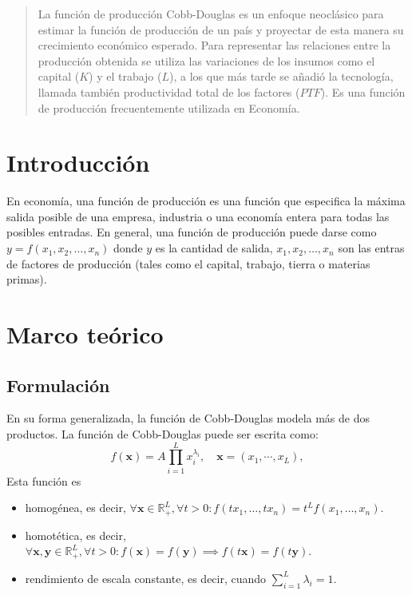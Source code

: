 \documentclass{sciposter}
\begin{document}
\begin{abstract}
La función de producción Cobb-Douglas es un enfoque neoclásico para estimar la función de producción de un país y proyectar de esta manera su crecimiento económico esperado. Para representar las relaciones entre la producción obtenida se utiliza las variaciones de los insumos como el capital ($K$) y el trabajo ($L$), a los que más tarde se añadió la tecnología, llamada también productividad total de los factores ($PTF$). Es una función de producción frecuentemente utilizada en Economía.
\end{abstract}

\begin{multicols*}{2}

\section{Introducción}
En economía, una función de producción es una función que especifica la máxima salida posible de una empresa, industria o una economía entera  para todas las posibles entradas. En general, una función de producción puede darse como $y=f\left(x_{1},x_{2},\ldots,x_{n}\right)$ donde $y$ es la cantidad de salida, $x_{1},x_{2},\ldots,x_{n}$ son las entras de factores de producción (tales como el capital, trabajo, tierra o materias primas).

\section{Marco teórico}

\subsection*{Formulación}
En su forma generalizada, la función de Cobb-Douglas modela más de dos productos. La función de Cobb-Douglas puede ser escrita como:
\begin{equation}
f\left(\bm{x}\right)=A\prod_{i=1}^{L}x_{i}^{\lambda_{i}},\quad \bm{x}=\left(x_{1},\cdots,x_{L} \right),
\end{equation}
Esta función es
\begin{itemize}
	\item homogénea, es decir, $\forall\bm{x}\in\mathbb{R}^{L}_{+},\forall t>0:f\left(tx_{1},\ldots,tx_{n}\right)=t^{L}f\left(x_{1},\ldots,x_{n}\right)$.
	\item homotética, es decir, $\forall\bm{x},\bm{y}\in \mathbb{R}^{L}_{+},\forall t>0:f\left(\bm{x}\right)=f\left(\bm{y}\right)\implies f\left(t\bm{x}\right)=f\left(t\bm{y}\right)$.
	\item rendimiento de escala constante, es decir, cuando $\sum_{i=1}^{L}\lambda_{i}=1$.
\end{itemize}


\end{multicols*}
\end{document}
